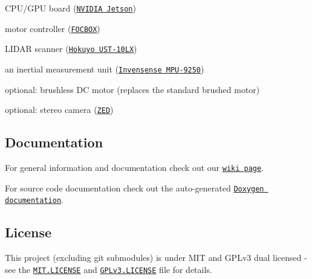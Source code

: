 \begin{DoxyItemize}
\item C\+P\+U/\+G\+PU board (\href{https://www.nvidia.com/object/jetson-tk1-embedded-dev-kit.html}{\tt N\+V\+I\+D\+IA Jetson})
\item motor controller (\href{https://www.enertionboards.com/FOCBOX-foc-motor-speed-controller.html}{\tt F\+O\+C\+B\+OX})
\item L\+I\+D\+AR scanner (\href{https://www.hokuyo-usa.com/products/scanning-laser-rangefinders/ust-10lx}{\tt Hokuyo U\+S\+T-\/10\+LX})
\item an inertial measurement unit (\href{https://www.invensense.com/products/motion-tracking/9-axis/mpu-9250/}{\tt Invensense M\+P\+U-\/9250})
\item optional\+: brushless DC motor (replaces the standard brushed motor)
\item optional\+: stereo camera (\href{https://www.stereolabs.com/zed/}{\tt Z\+ED})
\end{DoxyItemize}

\subsection*{Documentation}


\begin{DoxyItemize}
\item For general information and documentation check out our \href{https://github.com/Autonomous-Racing-PG/ros.package/wiki}{\tt wiki page}.
\item For source code documentation check out the auto-\/generated \href{https://autonomous-racing-pg.github.io/ros.package/html/index.html}{\tt Doxygen documentation}.
\end{DoxyItemize}

\subsection*{License}

This project (excluding git submodules) is under M\+IT and G\+P\+Lv3 dual licensed -\/ see the \href{MIT.LICENSE}{\tt M\+I\+T.\+L\+I\+C\+E\+N\+SE} and \href{GPLv3.LICENSE}{\tt G\+P\+Lv3.\+L\+I\+C\+E\+N\+SE} file for details. 